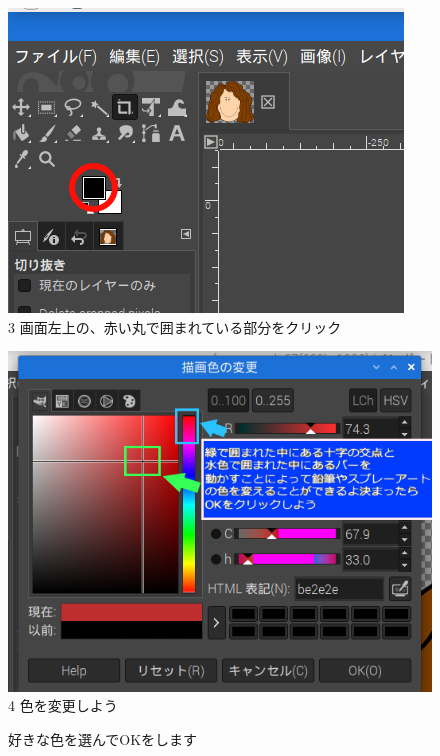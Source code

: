 \begin{figure}[ht]
  \begin{minipage}{0.4\textwidth}
    \includegraphics[width=\linewidth]{text01-img/textbook-img129.png}\\
    3 画面左上の、赤い丸で囲まれている部分をクリック
  \end{minipage}
  \hspace{2cm}
  \begin{minipage}{0.4\textwidth}
    \includegraphics[width=\linewidth]{text01-img/textbook-img126.png}\\
    4 色を変更しよう

    好きな色を選んでOKをします\\
  \end{minipage}


\end{figure}
